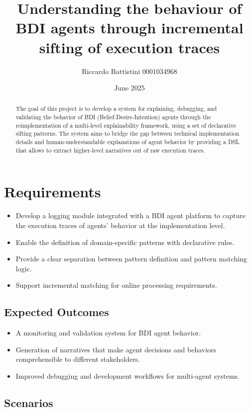 \documentclass{scrartcl}
\title{\LARGE Understanding the behaviour of BDI agents through incremental sifting of execution traces }
\author{ Riccardo Battistini 0001034968 \\ \emailaddr{riccardo.battistini2@studio.unibo.it} }
\date{June 2025}
\begin{document}
\maketitle

\begin{abstract}
    The goal of this project is to develop a system for explaining, debugging, and validating the behavior of BDI (Belief-Desire-Intention) agents through the reimplementation of a multi-level explainability framework, using a set of declarative sifting patterns. The system aims to bridge the gap between technical implementation details and human-understandable explanations of agent behavior by providing a DSL that allows to extract higher-level narratives out of raw execution traces.
\end{abstract}

\section{Requirements}

\begin{itemize}
\item Develop a logging module integrated with a BDI agent platform to capture the execution traces of agents' behavior at the implementation level.
\item Enable the definition of domain-specific patterns with declarative rules.
\item Provide a clear separation between pattern definition and pattern matching logic.
\item Support incremental matching for online processing requirements.
\end{itemize}

\subsection{Expected Outcomes}

\begin{itemize}
\item A monitoring and validation system for BDI agent behavior.
\item Generation of narratives that make agent decisions and behaviors comprehensible to different stakeholders.
\item Improved debugging and development workflows for multi-agent systems.
\end{itemize}

\subsection{Scenarios}
\end{document}
